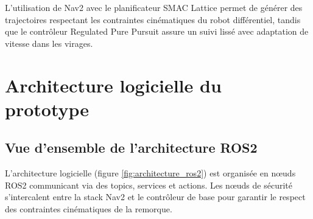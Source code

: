 \documentclass[a4paper,12pt]{report}
\begin{document}
L'utilisation de Nav2 avec le planificateur SMAC Lattice permet de générer des trajectoires respectant les contraintes cinématiques du robot différentiel, tandis que le contrôleur Regulated Pure Pursuit assure un suivi lissé avec adaptation de vitesse dans les virages.

\section{Architecture logicielle du prototype}
\label{sec:architecture_logicielle}

\subsection{Vue d'ensemble de l'architecture ROS2}
\label{subsec:vue_ensemble_ros2}

L'architecture logicielle (figure \ref{fig:architecture_ros2}) est organisée en nœuds ROS2 communicant via des topics, services et actions. Les nœuds de sécurité s'intercalent entre la stack Nav2 et le contrôleur de base pour garantir le respect des contraintes cinématiques de la remorque.
\end{document}
